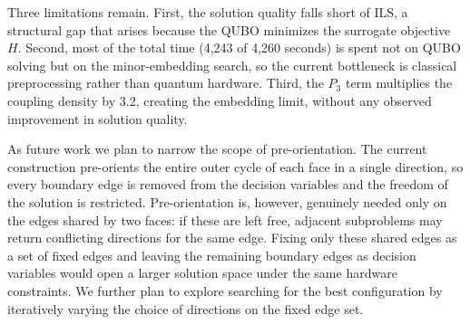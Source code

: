 \documentclass[twocolumn,a4paper]{article}
\begin{document}
Three limitations remain. First, the solution quality falls short of ILS, a structural gap that arises because the QUBO minimizes the surrogate objective \(H\). Second, most of the total time (4{,}243 of 4{,}260 seconds) is spent not on QUBO solving but on the minor-embedding search, so the current bottleneck is classical preprocessing rather than quantum hardware. Third, the \(P_3\) term multiplies the coupling density by 3.2, creating the embedding limit, without any observed improvement in solution quality.

As future work we plan to narrow the scope of pre-orientation. The current construction pre-orients the entire outer cycle of each face in a single direction, so every boundary edge is removed from the decision variables and the freedom of the solution is restricted. Pre-orientation is, however, genuinely needed only on the edges shared by two faces: if these are left free, adjacent subproblems may return conflicting directions for the same edge. Fixing only these shared edges as a set of fixed edges and leaving the remaining boundary edges as decision variables would open a larger solution space under the same hardware constraints. We further plan to explore searching for the best configuration by iteratively varying the choice of directions on the fixed edge set.



\end{document}

